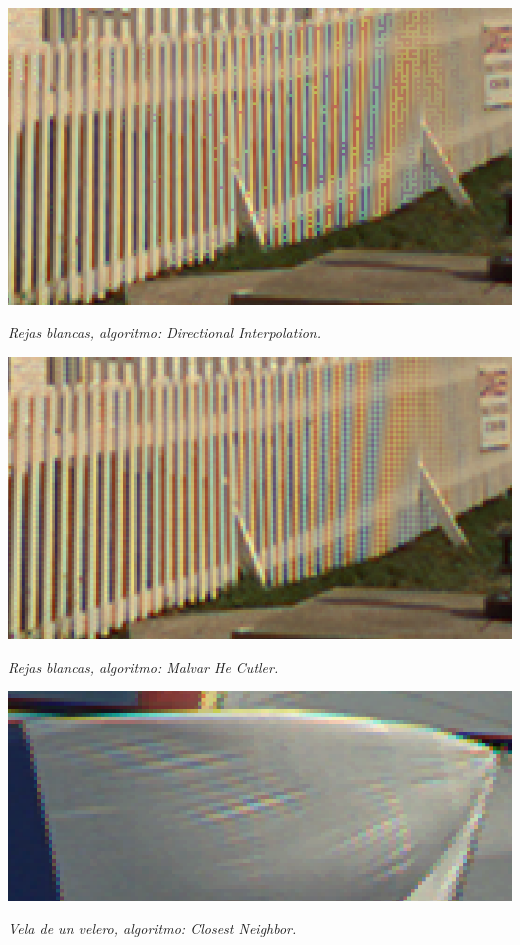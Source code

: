 	\begin{center}
		\includegraphics[scale=.5]{../enunciado/images_files/cualitativo/pharo_rails_directional.png}
		\vspace{2pt}
		\par
		\footnotesize\textit{Rejas blancas, algoritmo: Directional Interpolation.}
	\end{center}


	\begin{center}
		\includegraphics[scale=.5]{../enunciado/images_files/cualitativo/pharo_rails_malvar.png}
		\vspace{2pt}
		\par
		\footnotesize\textit{Rejas blancas, algoritmo: Malvar He Cutler.}
	\end{center}


	\begin{center}
		\includegraphics[scale=.5]{../enunciado/images_files/cualitativo/sailing_boat_closest.png}
		\vspace{2pt}
		\par
		\footnotesize\textit{Vela de un velero, algoritmo: Closest Neighbor.}
	\end{center}


